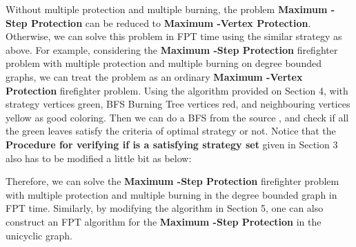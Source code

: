 \documentclass[11pt,letter]{article}
\begin{document}
Without multiple protection and multiple burning, the problem \textbf{Maximum -Step Protection} can be reduced to  \textbf{Maximum -Vertex Protection}. Otherwise, we can solve this problem in FPT time using the similar strategy as above. For example, considering the \textbf{Maximum -Step Protection} firefighter problem with multiple protection and multiple burning on degree bounded graphs, we can treat the problem as an ordinary \textbf{Maximum -Vertex Protection} firefighter problem. Using the algorithm provided on Section 4, with  strategy vertices green,  BFS Burning Tree vertices red, and  neighbouring vertices yellow as good coloring. Then we can do a BFS from the source , and check if all the green leaves satisfy the criteria of optimal strategy or not. Notice that the {\bf  Procedure for verifying if  is a satisfying strategy set} given in Section 3 also has to be modified a little bit as below:\\

\begin{center}
\end{center}

Therefore, we can solve the \textbf{Maximum -Step Protection} firefighter problem with multiple protection and multiple burning in the degree bounded graph in FPT time. Similarly, by modifying the algorithm in Section 5, one can also construct an FPT algorithm for the \textbf{Maximum -Step Protection} in the unicyclic graph.
\end{document}
